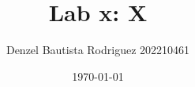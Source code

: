 \documentclass{homework}
\author{Denzel Bautista Rodriguez 202210461}
\date{\today}
\title{Lab x: X}
\begin{document}
 \maketitle

\begin{comment} %
\question \textbf{Pregunta 1}

\begin{enumerate} 
\renewcommand{\labelenumi}{\alph{enumi})} 

\item Item a

\item Item b

\item Item c

\item Item d

\item Item e

\item Item f

\item Item g

\end{enumerate}
\end{comment}
\end{document}
